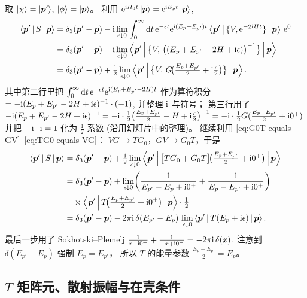 取 $\ket\chi=\ket{\bm p'}$, $\ket\phi=\ket{\bm p}$。
利用 $\mathrm{e}^{\mathrm{i} H_0 t}\ket{\bm p}=\mathrm{e}^{\mathrm{i} E_p t}\ket{\bm p}$,
\begin{align}
  \left\langle \bm p' \,\middle|\, S \,\middle|\, \bm p \right\rangle
  &= \delta_3(\bm p'-\bm p)
     - \mathrm{i}\lim_{\epsilon\downarrow 0}\int_0^\infty\mathrm{d} t\,
       \mathrm{e}^{-\epsilon t}\mathrm{e}^{\mathrm{i}(E_p+E_{p'})t}
       \left\langle \bm p' \,\middle|\, \{V,\mathrm{e}^{-2\mathrm{i} Ht}\} \,\middle|\, \bm p \right\rangle\,\mathrm{e}^{0}\notag\\
  &= \delta_3(\bm p'-\bm p)
     - \mathrm{i}\lim_{\epsilon\downarrow 0}
       \left\langle \bm p' \,\middle|\, \bigl\{V,\,
       \bigl((E_p+E_{p'}-2H+\mathrm{i}\epsilon)\bigr)^{-1}\bigr\} \,\middle|\, \bm p \right\rangle\notag\\
  &= \delta_3(\bm p'-\bm p)
     + \tfrac{1}{2}\lim_{\epsilon\downarrow 0}
       \left\langle \bm p' \,\middle|\, \bigl\{V,\,G\!\bigl(\tfrac{E_p+E_{p'}}{2}+\mathrm{i}\tfrac\epsilon 2\bigr)\bigr\} \,\middle|\, \bm p \right\rangle.
\end{align}
其中第二行里把
$\int_0^\infty\mathrm{d} t\,\mathrm{e}^{-\epsilon t}\mathrm{e}^{\mathrm{i}(E_p+E_{p'}-2H)t}$
作为算符积分 $=-\mathrm{i}(E_p+E_{p'}-2H+\mathrm{i}\epsilon)^{-1}\cdot(-1)$, 并整理 $\mathrm{i}$ 与符号；
第三行用了 $-\mathrm{i}(E_p+E_{p'}-2H+\mathrm{i}\epsilon)^{-1}
=-\mathrm{i}\cdot\tfrac{1}{2}\bigl(\tfrac{E_p+E_{p'}}{2}-H+\mathrm{i}\tfrac{\epsilon}{2}\bigr)^{-1}
=-\mathrm{i}\cdot\tfrac{1}{2}G(\tfrac{E_p+E_{p'}}{2}+\mathrm{i} 0^+)$
并把 $-\mathrm{i}\cdot\mathrm{i}=1$ 化为 $\tfrac12$ 系数 (沿用幻灯片中的整理)。
继续利用 \eqref{eq:G0T-equals-GV}--\eqref{eq:TG0-equals-VG}：
$VG\to T G_0$，$GV\to G_0 T$，于是
\begin{align}
  \left\langle \bm p' \,\middle|\, S \,\middle|\, \bm p \right\rangle
  &= \delta_3(\bm p'-\bm p)
     + \tfrac12\lim_{\epsilon\downarrow 0}
       \left\langle \bm p' \,\middle|\, \bigl[T G_0 + G_0 T\bigr]\!\bigl(\tfrac{E_p+E_{p'}}{2}+\mathrm{i} 0^+\bigr) \,\middle|\, \bm p \right\rangle\notag\\
  &= \delta_3(\bm p'-\bm p) + \lim_{\epsilon\downarrow 0}
     \!\left(\frac{1}{E_{p'}-E_p+\mathrm{i} 0^+} + \frac{1}{E_p-E_{p'}+\mathrm{i} 0^+}\right)\notag\\
  &\quad\times\left\langle \bm p' \,\middle|\, T\!\bigl(\tfrac{E_p+E_{p'}}{2}+\mathrm{i} 0^+\bigr) \,\middle|\, \bm p \right\rangle\cdot\tfrac12\notag\\
  &= \delta_3(\bm p'-\bm p)
     - 2\pi\mathrm{i}\,\delta(E_{p'}-E_p)\,
       \lim_{\epsilon\downarrow 0}\left\langle \bm p' \,\middle|\, T(E_p+\mathrm{i}\epsilon) \,\middle|\, \bm p \right\rangle.
\label{eq:S-T-onshell}
\end{align}
最后一步用了 Sokhotski--Plemelj
$\frac{1}{x+\mathrm{i} 0^+}+\frac{1}{-x+\mathrm{i} 0^+} = -2\pi\mathrm{i}\,\delta(x)$.
注意到 $\delta(E_{p'}-E_p)$ 强制 $E_p=E_{p'}$，
所以 $T$ 的能量参数 $\tfrac{E_p+E_{p'}}{2}=E_p$。

\subsection{$T$ 矩阵元、散射振幅与在壳条件}

